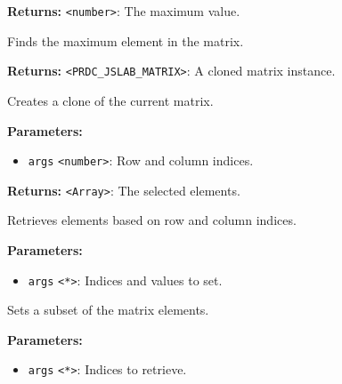 \documentclass[12pt,a4paper]{article}
\begin{document}
\noindent \textbf{Returns:} \texttt{<number>}: The maximum value.

\noindent Finds the maximum element in the matrix.

\vspace{5mm}
\noindent {}


\noindent \textbf{Returns:} \texttt{<PRDC\_JSLAB\_MATRIX>}: A cloned matrix instance.

\noindent Creates a clone of the current matrix.

\vspace{5mm}
\noindent {}


\noindent \textbf{Parameters:}
\begin{itemize}
  \item \texttt{args} \texttt{<number>}: Row and column indices.
\end{itemize}

\noindent \textbf{Returns:} \texttt{<Array>}: The selected elements.

\noindent Retrieves elements based on row and column indices.

\vspace{5mm}
\noindent {}


\noindent \textbf{Parameters:}
\begin{itemize}
  \item \texttt{args} \texttt{<*>}: Indices and values to set.
\end{itemize}

\noindent Sets a subset of the matrix elements.

\vspace{5mm}
\noindent {}


\noindent \textbf{Parameters:}
\begin{itemize}
  \item \texttt{args} \texttt{<*>}: Indices to retrieve.
\end{itemize}
\end{document}
